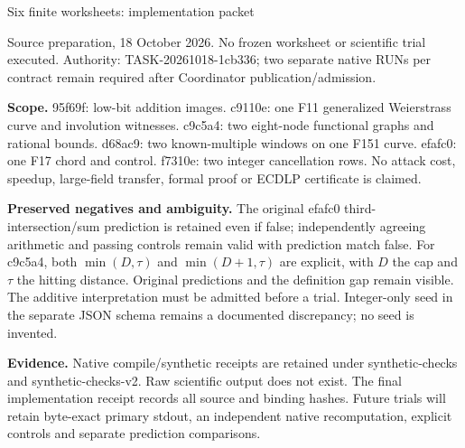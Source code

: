 \documentclass[10pt]{article}
\begin{document}
\begin{center}\Large Six finite worksheets: implementation packet\end{center}
\noindent Source preparation, 18 October 2026. No frozen worksheet or scientific
trial executed. Authority: TASK-20261018-1cb336; two separate native RUNs per contract
remain required after Coordinator publication/admission.
\begin{center}
\end{center}
\noindent\textbf{Scope.} 95f69f: low-bit addition images. c9110e: one F11
generalized Weierstrass curve and involution witnesses. c9c5a4: two eight-node
functional graphs and rational bounds. d68ac9: two known-multiple windows on one
F151 curve. efafc0: one F17 chord and control. f7310e: two integer cancellation
rows. No attack cost, speedup, large-field transfer, formal proof or ECDLP
certificate is claimed.

\medskip\noindent\textbf{Preserved negatives and ambiguity.} The original efafc0
third-intersection/sum prediction is retained even if false; independently
agreeing arithmetic and passing controls remain valid with prediction match
false. For c9c5a4, both $\min(D,\tau)$ and $\min(D+1,\tau)$ are explicit, with
$D$ the cap and $\tau$ the hitting distance. Original predictions and the
definition gap remain visible. The additive interpretation must be admitted
before a trial. Integer-only seed in the separate JSON schema remains a
documented discrepancy; no seed is invented.

\medskip\noindent\textbf{Evidence.} Native compile/synthetic receipts are retained
under synthetic-checks and synthetic-checks-v2. Raw scientific output does not
exist. The final implementation receipt records all source and binding hashes.
Future trials will retain byte-exact primary stdout, an independent native
recomputation, explicit controls and separate prediction comparisons.
\end{document}
